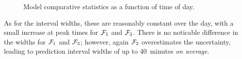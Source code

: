 \begin{knitrout}
\color{fgcolor}\begin{figure}
\newline
{}\newline
{}\caption[Model comparative statistics as a function of time of day]{Model comparative statistics as a function of time of day.}\label{fig:model_results_rmse_timeofday}
\end{figure}


\end{knitrout}

As for the interval widths, these are reasonably constant over the day, with a small increase at peak times for $\mathcal{F}_1$ and $\mathcal{F}_3$. There is no noticable difference in the widths for $\mathcal{F}_1$ and $\mathcal{F}_3$; however, again $\mathcal{F}_2$ overestimates the uncertainty, leading to prediction interval widths of up to 40~minutes \emph{on average}.



